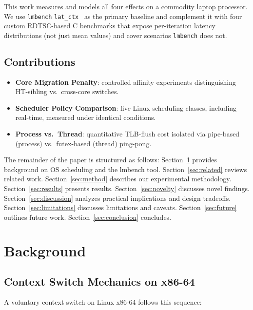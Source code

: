 \documentclass[conference]{IEEEtran}
\begin{document}
This work measures and models all four effects on a commodity laptop
processor.  We use \texttt{lmbench} \texttt{lat\_ctx}~\cite{mcvoy1996lmbench}
as the primary baseline and complement it with four custom RDTSC-based
C benchmarks that expose per-iteration latency distributions
(not just mean values) and cover scenarios \texttt{lmbench} does not.

\subsection*{Contributions}
\begin{itemize}
  \item \textbf{Core Migration Penalty}: controlled affinity experiments
        distinguishing HT-sibling vs.\ cross-core switches.
  \item \textbf{Scheduler Policy Comparison}: five Linux scheduling
        classes, including real-time, measured under identical conditions.
  \item \textbf{Process vs.\ Thread}: quantitative TLB-flush cost
        isolated via pipe-based (process) vs.\ futex-based (thread)
        ping-pong.
\end{itemize}

The remainder of the paper is structured as follows:
Section~\ref{sec:background} provides background on OS scheduling and
the lmbench tool.
Section~\ref{sec:related} reviews related work.
Section~\ref{sec:method} describes our experimental methodology.
Section~\ref{sec:results} presents results.
Section~\ref{sec:novelty} discusses novel findings.
Section~\ref{sec:discussion} analyzes practical implications and design tradeoffs.
Section~\ref{sec:limitations} discusses limitations and caveats.
Section~\ref{sec:future} outlines future work.
Section~\ref{sec:conclusion} concludes.

\section{Background}
\label{sec:background}

\subsection{Context Switch Mechanics on x86-64}

A voluntary context switch on Linux x86-64 follows this sequence:
\end{document}
